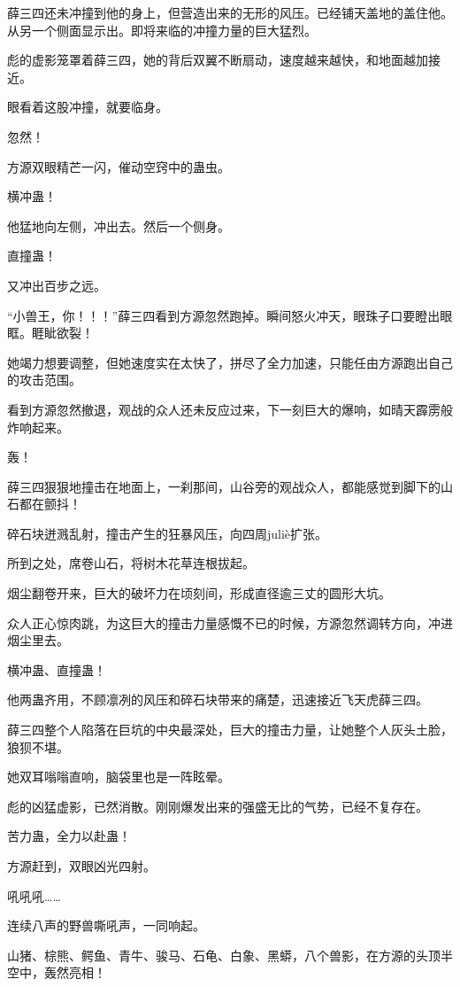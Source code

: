 \begin{this_body}
薛三四还未冲撞到他的身上，但营造出来的无形的风压。已经铺天盖地的盖住他。从另一个侧面显示出。即将来临的冲撞力量的巨大猛烈。

彪的虚影笼罩着薛三四，她的背后双翼不断扇动，速度越来越快，和地面越加接近。

眼看着这股冲撞，就要临身。

忽然！

方源双眼精芒一闪，催动空窍中的蛊虫。

横冲蛊！

他猛地向左侧，冲出去。然后一个侧身。

直撞蛊！

又冲出百步之远。

“小兽王，你！！！”薛三四看到方源忽然跑掉。瞬间怒火冲天，眼珠子口要瞪出眼眶。睚眦欲裂！

她竭力想要调整，但她速度实在太快了，拼尽了全力加速，只能任由方源跑出自己的攻击范围。

看到方源忽然撤退，观战的众人还未反应过来，下一刻巨大的爆响，如晴天霹雳般炸响起来。

轰！

薛三四狠狠地撞击在地面上，一刹那间，山谷旁的观战众人，都能感觉到脚下的山石都在颤抖！

碎石块迸溅乱射，撞击产生的狂暴风压，向四周juliè扩张。

所到之处，席卷山石，将树木花草连根拔起。

烟尘翻卷开来，巨大的破坏力在顷刻间，形成直径逾三丈的圆形大坑。

众人正心惊肉跳，为这巨大的撞击力量感慨不已的时候，方源忽然调转方向，冲进烟尘里去。

横冲蛊、直撞蛊！

他两蛊齐用，不顾凛冽的风压和碎石块带来的痛楚，迅速接近飞天虎薛三四。

薛三四整个人陷落在巨坑的中央最深处，巨大的撞击力量，让她整个人灰头土脸，狼狈不堪。

她双耳嗡嗡直响，脑袋里也是一阵眩晕。

彪的凶猛虚影，已然消散。刚刚爆发出来的强盛无比的气势，已经不复存在。

苦力蛊，全力以赴蛊！

方源赶到，双眼凶光四射。

吼吼吼……

连续八声的野兽嘶吼声，一同响起。

山猪、棕熊、鳄鱼、青牛、骏马、石龟、白象、黑蟒，八个兽影，在方源的头顶半空中，轰然亮相！


\end{this_body}

